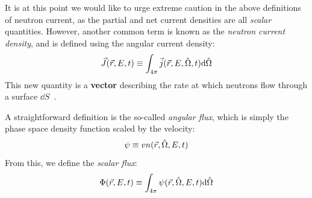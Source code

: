 It is at this point we would like to urge extreme caution in the above definitions of neutron current, as the partial and net current densities are all \emph{scalar} quantities.
However, another common term is known as the \textit{neutron current density}, and is defined using the angular current density:
\begin{equation}
  \label{eq:neutron-current-density}
  \vec{J}(\vec{r},E,t)\equiv \int_{4\pi}\vec{j}(\vec{r},E,\hat{\Omega},t)\dd \hat{\Omega}
\end{equation}
This new quantity is a \textbf{vector} describing the rate at which neutrons flow through a surface $\dd S$~\cite{duderstadtNuclearReactorAnalysis1976}.

A straightforward definition is the so-called \textit{angular flux}, which is simply the phase space density function scaled by the velocity:
\begin{equation}
  \label{eq:angular-flux}
  \psi\equiv vn(\vec{r},\hat{\Omega},E,t)
\end{equation}
From this, we define the \textit{scalar flux}:
\begin{equation}
  \label{eq:scalar-flux}
  \Phi (\vec{r},E,t)\equiv \int_{4\pi}\psi(\vec{r},\hat{\Omega},E,t)\dd \hat{\Omega}
\end{equation}